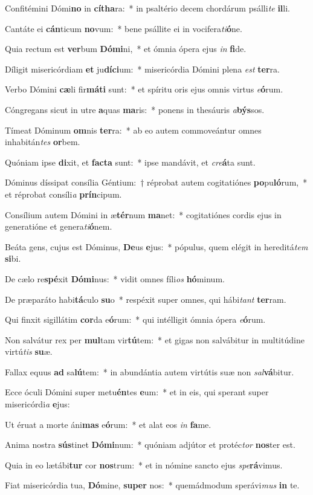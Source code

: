 \item Confitémini Dómi\textbf{no} in \textbf{cí}\textbf{tha}ra:~* in psaltério decem chordárum psálli\textit{te} \textbf{il}li.
\item Cantáte ei \textbf{cán}ticum \textbf{no}vum:~* bene psállite ei in vocifera\textit{ti}\textbf{ó}ne.
\item Quia rectum est \textbf{ver}bum \textbf{Dó}\textbf{mi}ni,~* et ómnia ópera ejus \textit{in} \textbf{fi}de.
\item Díligit misericórdiam \textbf{et} ju\textbf{dí}\textbf{ci}um:~* misericórdia Dómini plena \textit{est} \textbf{ter}ra.
\item Verbo Dómini \textbf{cæ}li fir\textbf{má}\textbf{ti} sunt:~* et spíritu oris ejus omnis virtus \textit{e}\textbf{ó}rum.
\item Cóngregans sicut in utre \textbf{a}quas \textbf{ma}ris:~* ponens in thesáuris \textit{a}\textbf{býs}sos.
\item Tímeat Dóminum \textbf{om}nis \textbf{ter}ra:~* ab eo autem commoveántur omnes inhabitán\textit{tes} \textbf{or}bem.
\item Quóniam ipse \textbf{di}xit, et \textbf{fac}\textbf{ta} sunt:~* ipse mandávit, et \textit{cre}\textbf{á}ta sunt.
\item Dóminus díssipat consília Géntium:~† réprobat autem cogitatiónes \textbf{po}pu\textbf{ló}rum,~* et réprobat consíli\textit{a} \textbf{prín}cipum.
\item Consílium autem Dómini in æ\textbf{tér}num \textbf{ma}net:~* cogitatiónes cordis ejus in generatióne et genera\textit{ti}\textbf{ó}nem.
\item Beáta gens, cujus est Dóminus, \textbf{De}us \textbf{e}jus:~* pópulus, quem elégit in hereditá\textit{tem} \textbf{si}bi.
\item De cælo re\textbf{spé}xit \textbf{Dó}\textbf{mi}nus:~* vidit omnes fíli\textit{os} \textbf{hó}minum.
\item De præparáto habi\textbf{tá}culo \textbf{su}o~* respéxit super omnes, qui hábi\textit{tant} \textbf{ter}ram.
\item Qui finxit sigillátim \textbf{cor}da e\textbf{ó}rum:~* qui intélligit ómnia ópera \textit{e}\textbf{ó}rum.
\item Non salvátur rex per \textbf{mul}tam vir\textbf{tú}tem:~* et gigas non salvábitur in multitúdine virtú\textit{tis} \textbf{su}æ.
\item Fallax equus \textbf{ad} sa\textbf{lú}tem:~* in abundántia autem virtútis suæ non \textit{sal}\textbf{vá}bitur.
\item Ecce óculi Dómini super metu\textbf{én}tes \textbf{e}um:~* et in eis, qui sperant super misericórdi\textit{a} \textbf{e}jus:
\item Ut éruat a morte áni\textbf{mas} e\textbf{ó}rum:~* et alat eos \textit{in} \textbf{fa}me.
\item Anima nostra \textbf{sús}tinet \textbf{Dó}\textbf{mi}num:~* quóniam adjútor et protéc\textit{tor} \textbf{nos}ter est.
\item Quia in eo lætábi\textbf{tur} cor \textbf{nos}trum:~* et in nómine sancto ejus \textit{spe}\textbf{rá}vimus.
\item Fiat misericórdia tua, \textbf{Dó}mine, \textbf{su}\textbf{per} nos:~* quemádmodum sperávi\textit{mus} \textbf{in} te.
